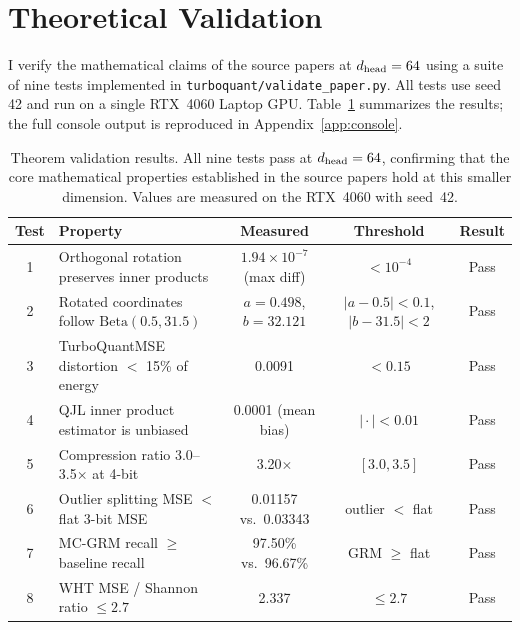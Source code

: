 
\section{Theoretical Validation}
\label{sec:validation}

I verify the mathematical claims of the source papers at $d_{\text{head}} = 64$
using a suite of nine tests implemented in
\texttt{turboquant/validate\_paper.py}.
All tests use seed 42 and run on a single RTX~4060 Laptop GPU.
Table~\ref{tab:theorem_tests} summarizes the results; the full console
output is reproduced in Appendix~\ref{app:console}.

\begin{table}[ht]
\vspace{-4pt}
\centering
\caption{Theorem validation results.
All nine tests pass at $d_{\text{head}} = 64$, confirming that the core
mathematical properties established in the source papers hold at
this smaller dimension.
Values are measured on the RTX~4060 with seed~42.}
\label{tab:theorem_tests}
\footnotesize
\begin{tabular}{@{}c>{\raggedright\arraybackslash}p{4.8cm}ccc@{}}
\toprule
\textbf{Test} & \textbf{Property} & \textbf{Measured} & \textbf{Threshold} & \textbf{Result} \\
\midrule
1 & Orthogonal rotation preserves inner products
  & $1.94 \times 10^{-7}$ (max diff) & $< 10^{-4}$ & Pass \\
2 & Rotated coordinates follow $\mathrm{Beta}(0.5, 31.5)$
  & $a{=}0.498$, $b{=}32.121$ & $|a{-}0.5|{<}0.1$, $|b{-}31.5|{<}2$ & Pass \\
3 & TurboQuantMSE distortion $<$ 15\% of energy
  & 0.0091 & $< 0.15$ & Pass \\
4 & QJL inner product estimator is unbiased
  & 0.0001 (mean bias) & $|{}\cdot{}| < 0.01$ & Pass \\
5 & Compression ratio 3.0--3.5$\times$ at 4-bit
  & 3.20$\times$ & $[3.0, 3.5]$ & Pass \\
6 & Outlier splitting MSE $<$ flat 3-bit MSE
  & 0.01157 vs.\ 0.03343 & outlier $<$ flat & Pass \\
7 & MC-GRM recall $\geq$ baseline recall
  & 97.50\% vs.\ 96.67\% & GRM $\geq$ flat & Pass \\
8 & WHT MSE / Shannon ratio $\leq 2.7$
  & 2.337 & $\leq 2.7$ & Pass \\

\end{tabular}
\end{table}
